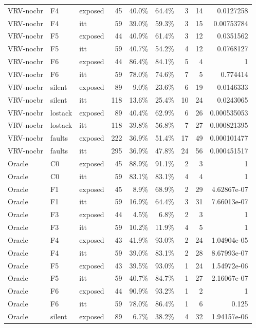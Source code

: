\begin{tabular}{lllrrrrrr}
VRV-nocbr & F4 & exposed & 45 & 40.0\% & 64.4\% & 3 & 14 & 0.0127258 \\
VRV-nocbr & F4 & itt & 59 & 39.0\% & 59.3\% & 3 & 15 & 0.00753784 \\
VRV-nocbr & F5 & exposed & 44 & 40.9\% & 61.4\% & 3 & 12 & 0.0351562 \\
VRV-nocbr & F5 & itt & 59 & 40.7\% & 54.2\% & 4 & 12 & 0.0768127 \\
VRV-nocbr & F6 & exposed & 44 & 86.4\% & 84.1\% & 5 & 4 & 1 \\
VRV-nocbr & F6 & itt & 59 & 78.0\% & 74.6\% & 7 & 5 & 0.774414 \\
VRV-nocbr & silent & exposed & 89 & 9.0\% & 23.6\% & 6 & 19 & 0.0146333 \\
VRV-nocbr & silent & itt & 118 & 13.6\% & 25.4\% & 10 & 24 & 0.0243065 \\
VRV-nocbr & lostack & exposed & 89 & 40.4\% & 62.9\% & 6 & 26 & 0.000535053 \\
VRV-nocbr & lostack & itt & 118 & 39.8\% & 56.8\% & 7 & 27 & 0.000821395 \\
VRV-nocbr & faults & exposed & 222 & 36.9\% & 51.4\% & 17 & 49 & 0.000101477 \\
VRV-nocbr & faults & itt & 295 & 36.9\% & 47.8\% & 24 & 56 & 0.000451517 \\
Oracle & C0 & exposed & 45 & 88.9\% & 91.1\% & 2 & 3 & 1 \\
Oracle & C0 & itt & 59 & 83.1\% & 83.1\% & 4 & 4 & 1 \\
Oracle & F1 & exposed & 45 & 8.9\% & 68.9\% & 2 & 29 & 4.62867e-07 \\
Oracle & F1 & itt & 59 & 16.9\% & 64.4\% & 3 & 31 & 7.66013e-07 \\
Oracle & F3 & exposed & 44 & 4.5\% & 6.8\% & 2 & 3 & 1 \\
Oracle & F3 & itt & 59 & 10.2\% & 11.9\% & 4 & 5 & 1 \\
Oracle & F4 & exposed & 43 & 41.9\% & 93.0\% & 2 & 24 & 1.04904e-05 \\
Oracle & F4 & itt & 59 & 39.0\% & 83.1\% & 2 & 28 & 8.67993e-07 \\
Oracle & F5 & exposed & 43 & 39.5\% & 93.0\% & 1 & 24 & 1.54972e-06 \\
Oracle & F5 & itt & 59 & 40.7\% & 84.7\% & 1 & 27 & 2.16067e-07 \\
Oracle & F6 & exposed & 44 & 90.9\% & 93.2\% & 1 & 2 & 1 \\
Oracle & F6 & itt & 59 & 78.0\% & 86.4\% & 1 & 6 & 0.125 \\
Oracle & silent & exposed & 89 & 6.7\% & 38.2\% & 4 & 32 & 1.94157e-06 \\

\end{tabular}
